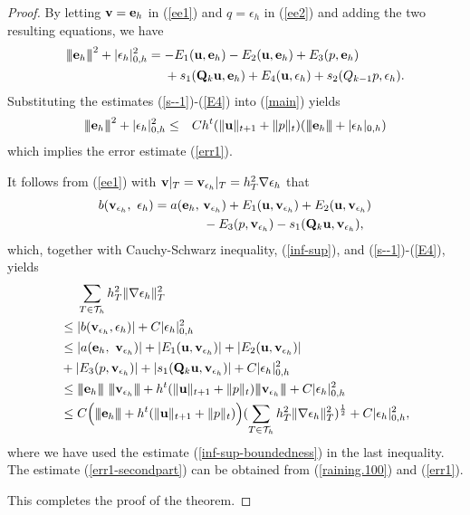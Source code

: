 \documentclass[11pt]{amsart}
\newcommand{\bu}{{\bf u}}
\newcommand{\be}{{\bf e}}
\newcommand{\bv}{{\bf v}}
\newcommand{\bQ}{{\bf Q}}
\def\T{{\mathcal T}}
\def\3bar{{|\hspace{-.02in}|\hspace{-.02in}|}}
\def\ad#1{\begin{aligned}#1\end{aligned}}  \def\b#1{\mathbf{#1}} \def\hb#1{\hat{\mathbf{#1}}}
\def\a#1{\begin{align*}#1\end{align*}} \def\an#1{\begin{align}#1\end{align}} \def\t#1{\hbox{#1}}
\begin{document}
\smallskip

\begin{proof}
By letting $\bv=\be_h$ in (\ref{ee1}) and $q=\epsilon_h$ in
(\ref{ee2}) and adding the two resulting equations, we have
\an{ \ad{
\3bar\be_h\3bar^2+|\epsilon_h|_{0,h}^2&= -E_1(\bu,\be_h)-E_2(\bu,\be_h)+E_3(p,\be_h)\\
&\quad \ +s_1(\bQ_k\bu,\be_h)+E_4(\bu,\epsilon_h)+s_2(Q_{k-1} p, \epsilon_h). }
\label{main} }
Substituting the estimates (\ref{s--1})-(\ref{E4}) into (\ref{main}) yields
\begin{eqnarray}
\3bar\be_h\3bar^2+|\epsilon_h|_{0,h}^2&\le&Ch^t(\|\bu\|_{t+1}+\|p\|_t)(\3bar \be_h\3bar+ |\epsilon_h|_{0,h})\label{b-u}
\end{eqnarray}
which implies the error estimate (\ref{err1}).

It follows from (\ref{ee1}) with $\bv|_T=\bv_{\epsilon_h}|_T=h_T^2\nabla \epsilon_h$ that
\a{
b(\bv_{\epsilon_h},\ \epsilon_h)=a(\be_h,\ & \bv_{\epsilon_h})+E_1(\bu,\bv_{\epsilon_h})+E_2(\bu,\bv_{\epsilon_h})\\ & -E_3(p,\bv_{\epsilon_h})-s_1(\bQ_k\bu,\bv_{\epsilon_h}),
 }
 which, together with Cauchy-Schwarz inequality, (\ref{inf-sup}), and (\ref{s--1})-(\ref{E4}), yields
\begin{equation}\label{raining.100}
\begin{split} &\quad \ 
\sum_{T\in\T_h} h_T^2\|\nabla\epsilon_h\|_{T}^2\\
&\leq |b(\bv_{\epsilon_h},
\epsilon_h)| + C |\epsilon_h|_{0,h}^2\\
&\leq |a(\be_h,\ \bv_{\epsilon_h})|+|E_1(\bu,\bv_{\epsilon_h})|+|E_2(\bu,\bv_{\epsilon_h})|\\
&+|E_3(p,\bv_{\epsilon_h})|+|s_1(\bQ_k\bu,\bv_{\epsilon_h})|+C |\epsilon_h|_{0,h}^2\\
&\leq \3bar \be_h\3bar\ \3bar \bv_{\epsilon_h}\3bar +
h^t(\|\bu\|_{t+1}+\|p\|_t) \3bar\bv_{\epsilon_h}\3bar + C
 |\epsilon_h|_{0,h}^2\\
&\leq C\Big(\3bar \be_h\3bar + h^t(\|\bu\|_{t+1}+\|p\|_t)\Big)
(\sum_{T\in\T_h} h_T^2 \|\nabla\epsilon_h\|_T^2)^\frac12 + C |\epsilon_h|_{0,h}^2,
\end{split}
\end{equation}
where we have used the estimate (\ref{inf-sup-boundedness})  in the
last inequality. The estimate (\ref{err1-secondpart}) can be obtained  from (\ref{raining.100}) and
(\ref{err1}). 

This completes the proof of the theorem.
\end{proof}
\end{document}
